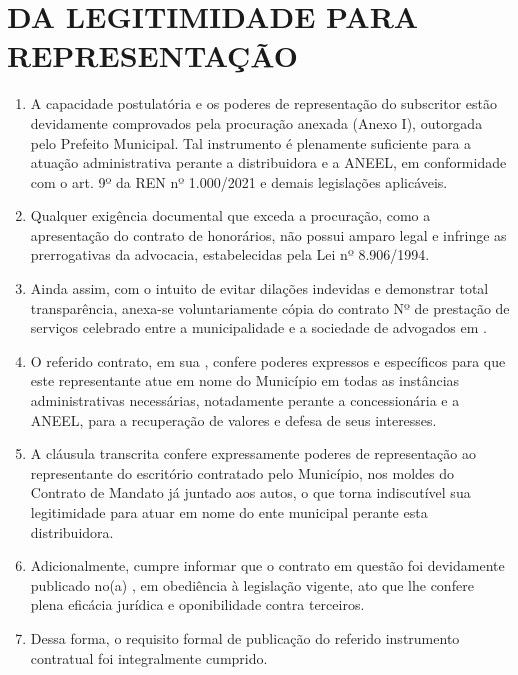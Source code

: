 \section{DA LEGITIMIDADE PARA REPRESENTAÇÃO}

\begin{enumerate}[resume]
\item A capacidade postulatória e os poderes de representação do subscritor estão devidamente comprovados pela procuração anexada (Anexo I), outorgada pelo Prefeito Municipal. Tal instrumento é plenamente suficiente para a atuação administrativa perante a distribuidora e a ANEEL, em conformidade com o art. 9º da REN nº 1.000/2021 e demais legislações aplicáveis.
\item Qualquer exigência documental que exceda a procuração, como a apresentação do contrato de honorários, não possui amparo legal e infringe as prerrogativas da advocacia, estabelecidas pela Lei nº 8.906/1994.
\item Ainda assim, com o intuito de evitar dilações indevidas e demonstrar total transparência, anexa-se voluntariamente cópia do contrato Nº \numeroContrato{} de prestação de serviços celebrado entre a municipalidade e a sociedade de advogados em \dataPublicacao{}.
\item O referido contrato, em sua \textbf{\tituloClausula{}}, confere poderes expressos e específicos para que este representante atue em nome do Município em todas as instâncias administrativas necessárias, notadamente perante a concessionária e a ANEEL, para a recuperação de valores e defesa de seus interesses.
\Citacao{\clausula{}}
\item A cláusula transcrita confere expressamente poderes de representação ao representante do escritório contratado pelo Município, nos moldes do Contrato de Mandato já juntado aos autos, o que torna indiscutível sua legitimidade para atuar em nome do ente municipal perante esta distribuidora.
\item Adicionalmente, cumpre informar que o contrato em questão foi devidamente publicado no(a) \textbf{\publicacao{}}, em obediência à legislação vigente, ato que lhe confere plena eficácia jurídica e oponibilidade contra terceiros.
\item Dessa forma, o requisito formal de publicação do referido instrumento contratual foi integralmente cumprido. 
\end{enumerate}

